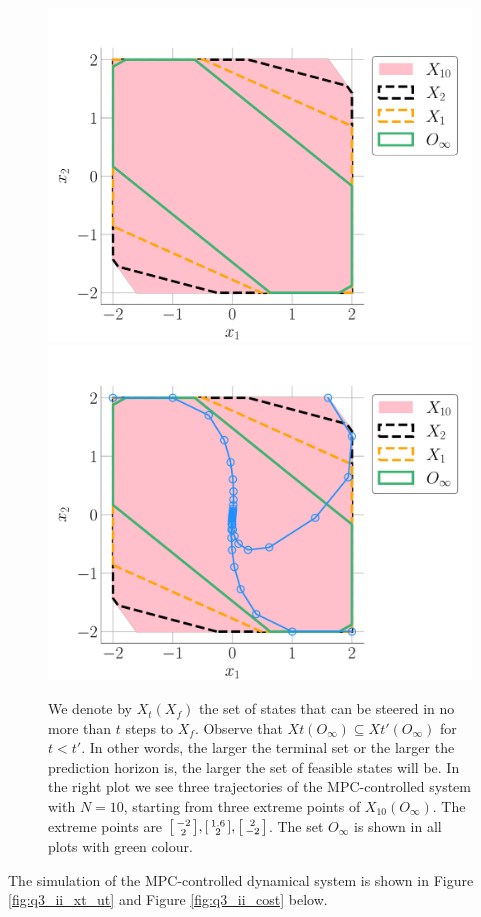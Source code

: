 \documentclass[a4paper,11pt,reqno]{amsart}
\begin{document}
\begin{figure}[H]
    \centering
    \vspace{-0.35cm}
    \includegraphics[width=0.45\linewidth]{figures/q3_ii_X.pdf}
    \includegraphics[width=0.45\linewidth]{figures/q3_ii_X_x.pdf}
    \caption{We denote by $X_t(X_f)$ the set of states that can be steered in no more than $t$
    steps to $X_f$. Observe that $Xt(O_{\infty})\subseteq Xt'(O_{\infty})$ for $t < t'$. In
    other words, the larger the terminal set or the larger the prediction horizon is, the larger
    the set of feasible states will be. In the right plot we see three trajectories of the
    MPC-controlled system with $N = 10$, starting from three extreme points of $X_{10}(O_\infty)$. The extreme points are $\begin{bsmallmatrix}-2\\2\end{bsmallmatrix}, \begin{bsmallmatrix}1.6\\2\end{bsmallmatrix}, \begin{bsmallmatrix}2\\-2\end{bsmallmatrix}$. The set
    $O_{\infty}$ is shown in all plots with green colour.
    \label{fig:q3_ii_Xx}}
\end{figure}
The simulation of the MPC-controlled dynamical system is shown in Figure \ref{fig:q3_ii_xt_ut} and Figure \ref{fig:q3_ii_cost} below.
\end{document}

